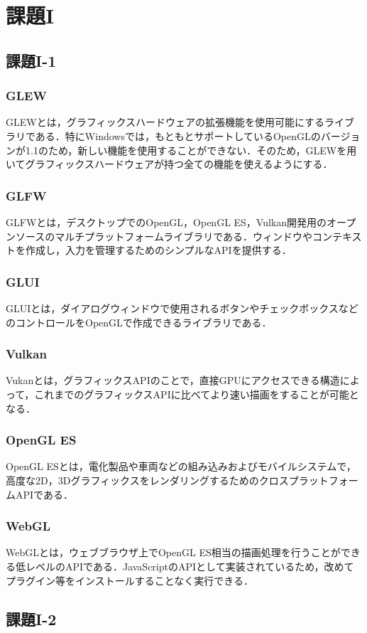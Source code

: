 \documentclass[]{jsarticle}
\begin{document}
%
\section{課題I}
%
%
%
\subsection{課題I-1}
%
%
\subsubsection{GLEW}
GLEWとは，グラフィックスハードウェアの拡張機能を使用可能にするライブラリである．特にWindowsでは，もともとサポートしているOpenGLのバージョンが1.1のため，新しい機能を使用することができない．そのため，GLEWを用いてグラフィックスハードウェアが持つ全ての機能を使えるようにする．
%
%
%
\subsubsection{GLFW}
GLFWとは，デスクトップでのOpenGL，OpenGL ES，Vulkan開発用のオープンソースのマルチプラットフォームライブラリである．ウィンドウやコンテキストを作成し，入力を管理するためのシンプルなAPIを提供する．
%
%
\subsubsection{GLUI}
GLUIとは，ダイアログウィンドウで使用されるボタンやチェックボックスなどのコントロールをOpenGLで作成できるライブラリである．
%
%
\subsubsection{Vulkan}
Vukanとは，グラフィックスAPIのことで，直接GPUにアクセスできる構造によって，これまでのグラフィックスAPIに比べてより速い描画をすることが可能となる．
%
%
\subsubsection{OpenGL ES}
OpenGL ESとは，電化製品や車両などの組み込みおよびモバイルシステムで，高度な2D，3DグラフィックスをレンダリングするためのクロスプラットフォームAPIである．
%
%
\subsubsection{WebGL}
WebGLとは，ウェブブラウザ上でOpenGL ES相当の描画処理を行うことができる低レベルのAPIである．JavaScriptのAPIとして実装されているため，改めてプラグイン等をインストールすることなく実行できる．
%
%
%
\subsection{課題I-2}
\end{document}
